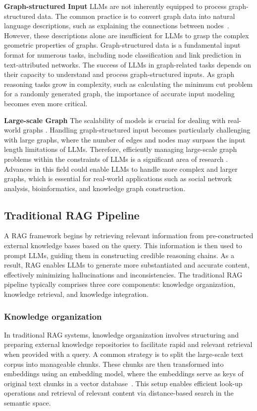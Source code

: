 \documentclass[lettersize,journal]{IEEEtran}
\begin{document}
\noindent\textbf{Graph-structured Input} LLMs are not inherently equipped to process graph-structured data. The common practice is to convert graph data into natural language descriptions, such as explaining the connections between nodes~\cite{liu2024can,huang2024can-tmlr}. However, these descriptions alone are insufficient for LLMs to grasp the complex geometric properties of graphs. Graph-structured data is a fundamental input format for numerous tasks, including node classification and link prediction in text-attributed networks. The success of LLMs in graph-related tasks depends on their capacity to understand and process graph-structured inputs. As graph reasoning tasks grow in complexity, such as calculating the minimum cut problem for a randomly generated graph, the importance of accurate input modeling becomes even more critical.

\noindent\textbf{Large-scale Graph} The scalability of models is crucial for dealing with real-world graphs \cite{wan2023scalable}. Handling graph-structured input becomes particularly challenging with large graphs, where the number of edges and nodes may surpass the input length limitations of LLMs. Therefore, efficiently managing large-scale graph problems within the constraints of LLMs is a significant area of research \cite{bi2024lpnl}. Advances in this field could enable LLMs to handle more complex and larger graphs, which is essential for real-world applications such as social network analysis, bioinformatics, and knowledge graph construction.




\subsection{Traditional RAG Pipeline}\label{sec:ragpipeline}
A RAG framework begins by retrieving relevant information from pre-constructed external knowledge bases based on the query. This information is then used to prompt LLMs, guiding them in constructing credible reasoning chains. As a result, RAG enables LLMs to generate more substantiated and accurate content, effectively minimizing hallucinations and inconsistencies. The traditional RAG pipeline typically comprises three core components: knowledge organization, knowledge retrieval, and knowledge integration.

\subsubsection{Knowledge organization}
In traditional RAG systems, knowledge organization involves structuring and preparing external knowledge repositories to facilitate rapid and relevant retrieval when provided with a query. A common strategy is to split the large-scale text corpus into manageable chunks. These chunks are then transformed into embeddings using an embedding model, where the embeddings serve as keys of original text chunks in a vector database~\cite{borgeaud2022improving,izacard2023atlas,jiang2023active}. This setup enables efficient look-up operations and retrieval of relevant content via distance-based search in the semantic space.
\end{document}
